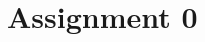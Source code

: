 \documentclass[11pt,oneside]{book}
\begin{document}
   \frontmatter
   \tableofcontents

   \mainmatter
   \chapter{Assignment 0}
    \newpage
\end{document}
